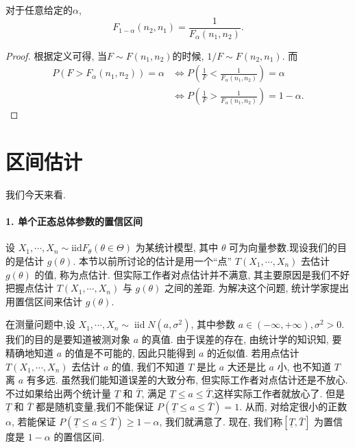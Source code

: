 \begin{corollary}
    对于任意给定的$\alpha$, 
    \[
        F_{1-\alpha}(n_2, n_1)=\frac{1}{F_\alpha(n_1, n_2)}.     
    \]
\end{corollary}

\begin{proof}
    根据定义可得, 当$F\sim F(n_1, n_2)$的时候, $1/F\sim F(n_2, n_1)$. 而
    \[
        \begin{aligned}
            P\left(F>F_\alpha(n_1, n_2)\right)=\alpha &\iff P(\frac1F<\frac1{F_\alpha(n_1, n_2)})=\alpha \\
            &\iff P\left(\frac1F>\frac1{F_\alpha(n_1, n_2)}\right)=1-\alpha .
        \end{aligned}
    \]
\end{proof}

\section{区间估计}

我们今天来看. 

\paragraph{1. 单个正态总体参数的置信区间}
设 $X_1, \cdots, X_n \sim \mathrm{iid} F_\theta(\theta \in \Theta)$ 为某统计模型, 其中 $\theta$ 可为向量参数.现设我们的目的是估计 $g(\theta)$. 本节以前所讨论的估计是用一个``点'' $T\left(X_1, \cdots, X_n\right)$ 去估计 $g(\theta)$ 的值, 称为点估计. 但实际工作者对点估计并不满意, 其主要原因是我们不好把握点估计 $T\left(X_1, \cdots, X_n\right)$ 与 $g(\theta)$ 之间的差距. 为解决这个问题, 统计学家提出用置信区间来估计 $g(\theta)$. 

\begin{example}
    在测量问题中,设 $X_1, \cdots, X_n \sim \operatorname{iid} N\left(a, \sigma^2\right)$, 其中参数 $a \in(-\infty,+\infty), \sigma^2>0$. 我们的目的是要知道被测对象 $a$ 的真值. 由于误差的存在, 由统计学的知识知, 要精确地知道 $a$ 的值是不可能的, 因此只能得到 $a$ 的近似值. 若用点估计 $T\left(X_1, \cdots, X_n\right)$ 去估计 $a$ 的值, 我们不知道 $T$ 是比 $a$ 大还是比 $a$ 小, 也不知道 $T$ 离 $a$ 有多远. 虽然我们能知道误差的大致分布, 但实际工作者对点估计还是不放心. 不过如果给出两个统计量 $\underline T$ 和 $\bar{T}$, 满足 $\underline T \leq a \leq\bar{T}$,这样实际工作者就放心了. 但是 $\underline{T}$ 和 $\bar{T}$ 都是随机变量,我们不能保证 $P(\underline{T} \leq a \leq \bar{T})=1$. 从而, 对给定很小的正数 $\alpha$, 若能保证 $P(\underline{T} \leq a \leq \bar T)\geq 1-\alpha $, 我们就满意了. 现在, 我们称$[\underline T, \bar{T}]$ 为置信度是 $1-\alpha$ 的置信区间.
\end{example}

